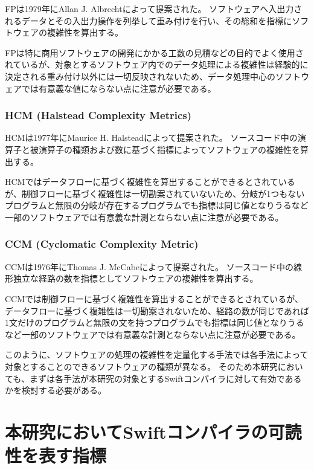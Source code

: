 FPは1979年にAllan J. Albrechtによって提案された。
ソフトウェアへ入出力されるデータとその入出力操作を列挙して重み付けを行い、その総和を指標にソフトウェアの複雑性を算出する。

FPは特に商用ソフトウェアの開発にかかる工数の見積などの目的でよく使用されているが、対象とするソフトウェア内でのデータ処理による複雑性は経験的に決定される重み付け以外には一切反映されないため、データ処理中心のソフトウェアでは有意義な値にならない点に注意が必要である。

\subsubsection{HCM (Halstead Complexity Metrics)}

HCMは1977年にMaurice H. Halsteadによって提案された。
ソースコード中の演算子と被演算子の種類および数に基づく指標によってソフトウェアの複雑性を算出する。

HCMではデータフローに基づく複雑性を算出することができるとされているが、制御フローに基づく複雑性は一切勘案されていないため、分岐が1つもないプログラムと無限の分岐が存在するプログラムでも指標は同じ値となりうるなど一部のソフトウェアでは有意義な計測とならない点に注意が必要である。

\subsubsection{CCM (Cyclomatic Complexity Metric)}

CCMは1976年にThomas J. McCabeによって提案された。
ソースコード中の線形独立な経路の数を指標としてソフトウェアの複雑性を算出する。

CCMでは制御フローに基づく複雑性を算出することができるとされているが、データフローに基づく複雑性は一切勘案されないため、経路の数が同じであれば1文だけのプログラムと無限の文を持つプログラムでも指標は同じ値となりうるなど一部のソフトウェアでは有意義な計測とならない点に注意が必要である。

\vspace{2em}

このように、ソフトウェアの処理の複雑性を定量化する手法では各手法によって対象とすることのできるソフトウェアの種類が異なる。
そのため本研究においても、まずは各手法が本研究の対象とするSwiftコンパイラに対して有効であるかを検討する必要がある。


\section{本研究においてSwiftコンパイラの可読性を表す指標}
\label{issue:barometer}

